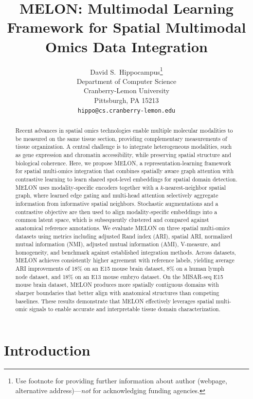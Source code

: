 \documentclass{article}
\title{MELON: Multimodal Learning Framework for Spatial Multimodal Omics Data Integration}
\author{%
  David S.~Hippocampus\thanks{Use footnote for providing further information
    about author (webpage, alternative address)---\emph{not} for acknowledging
  funding agencies.} \\
  Department of Computer Science\\
  Cranberry-Lemon University\\
  Pittsburgh, PA 15213 \\
  \texttt{hippo@cs.cranberry-lemon.edu} \\
}
\theoremstyle{plain}
\theoremstyle{definition}
\begin{document}
\maketitle

\begin{abstract}
  Recent advances in spatial omics technologies enable multiple molecular modalities to be measured on the same tissue section, providing
  complementary measurements of tissue organization. A central challenge is to integrate heterogeneous modalities, such as gene expression and chromatin accessibility, while preserving spatial structure and biological coherence. Here, we propose MELON, a representation-learning framework for spatial multi-omics integration that combines spatially aware graph attention with contrastive learning to learn shared spot-level embeddings for spatial domain detection. MELON uses modality-specific encoders together with a $k$-nearest-neighbor spatial graph, where learned edge gating and multi-head attention selectively aggregate information from informative spatial neighbors. Stochastic
  augmentations and a contrastive objective are then used to align modality-specific embeddings into a common latent space, which is subsequently clustered and compared against anatomical reference annotations. We evaluate MELON on three spatial multi-omics datasets using metrics including adjusted Rand index (ARI), spatial ARI, normalized mutual
  information (NMI), adjusted mutual information (AMI), V-measure, and homogeneity, and benchmark against established integration methods. Across datasets, MELON achieves consistently higher agreement with reference labels, yielding average ARI improvements of 18\% on an E15 mouse brain dataset, 8\% on a human lymph node dataset, and 18\% on an E13 mouse embryo dataset. On the MISAR-seq E15 mouse brain dataset, MELON produces more spatially contiguous domains with sharper boundaries that better align with anatomical structures than competing baselines. These results demonstrate that MELON effectively leverages spatial multi-omic signals to enable accurate and interpretable tissue domain characterization.
\end{abstract}

\section{Introduction}
\end{document}
